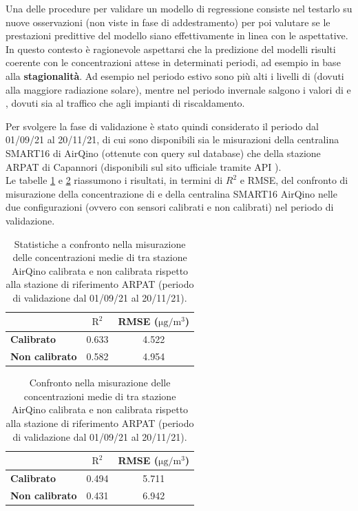 Una delle procedure per validare un modello di regressione consiste nel testarlo su nuove osservazioni (non viste in fase di addestramento) per poi valutare se le prestazioni predittive del modello siano effettivamente in linea con le aspettative. In questo contesto è ragionevole aspettarsi che la predizione del modelli risulti coerente con le concentrazioni attese in determinati periodi, ad esempio in base alla \textbf{stagionalità}. Ad esempio nel periodo estivo sono più alti i livelli di  (dovuti alla maggiore radiazione solare), mentre nel periodo invernale salgono i valori di  e , dovuti sia al traffico che agli impianti di riscaldamento.

Per svolgere la fase di validazione è stato quindi considerato il periodo dal 01/09/21 al 20/11/21, di cui sono disponibili sia le misurazioni della centralina SMART16 di AirQino (ottenute con query sul database) che della stazione ARPAT di Capannori (disponibili sul sito ufficiale tramite API \cite{arpat}).\\

Le tabelle \ref{tab:val-pm25} e \ref{tab:val-pm10} riassumono i risultati, in termini di $R^2$ e RMSE, del confronto di misurazione della concentrazione di  e  della centralina SMART16 AirQino nelle due configurazioni (ovvero con sensori calibrati e non calibrati) nel periodo di validazione.

\vspace{5mm}
\begin{table}[H]
\footnotesize
\centering
\begin{tabular}{|l|c|c|}
\cline{2-3}
\multicolumn{1}{c|}{} & $\bm{\mathrm{R^2}}$ & \textbf{RMSE (}$\mathrm{\si{\micro}g/m^3}$) \\ \hline
\textbf{Calibrato} & 0.633 & 4.522 \\ \hline
\textbf{Non calibrato} & 0.582 & 4.954 \\ \hline
\end{tabular}
\caption{Statistiche a confronto nella misurazione delle concentrazioni medie di  tra stazione AirQino calibrata e non calibrata rispetto alla stazione di riferimento ARPAT (periodo di validazione dal 01/09/21 al 20/11/21).}
\label{tab:val-pm25}
\end{table}

\begin{table}[H]
\footnotesize
\centering
\begin{tabular}{|l|c|c|}
\cline{2-3}
\multicolumn{1}{c|}{} & $\bm{\mathrm{R^2}}$ & \textbf{RMSE (}$\mathrm{\si{\micro}g/m^3}$) \\ \hline
\textbf{Calibrato} & 0.494 & 5.711 \\ \hline
\textbf{Non calibrato} & 0.431 & 6.942 \\ \hline
\end{tabular}
\caption{Confronto nella misurazione delle concentrazioni medie di  tra stazione AirQino calibrata e non calibrata rispetto alla stazione di riferimento ARPAT (periodo di validazione dal 01/09/21 al 20/11/21).}
\label{tab:val-pm10}
\end{table}


